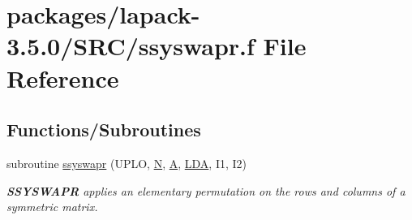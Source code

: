 \hypertarget{ssyswapr_8f}{}\section{packages/lapack-\/3.5.0/\+S\+R\+C/ssyswapr.f File Reference}
\label{ssyswapr_8f}
\subsection*{Functions/\+Subroutines}
\begin{DoxyCompactItemize}
\item 
subroutine \hyperlink{group__realSYauxiliary_gad09b2a02a370c25292456c37fb1b8245}{ssyswapr} (U\+P\+L\+O, \hyperlink{polmisc_8c_a0240ac851181b84ac374872dc5434ee4}{N}, \hyperlink{classA}{A}, \hyperlink{example__user_8c_ae946da542ce0db94dced19b2ecefd1aa}{L\+D\+A}, I1, I2)
\begin{DoxyCompactList}\small\item\em {\bfseries S\+S\+Y\+S\+W\+A\+P\+R} applies an elementary permutation on the rows and columns of a symmetric matrix. \end{DoxyCompactList}\end{DoxyCompactItemize}
